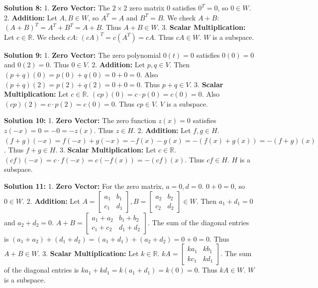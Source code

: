 \documentclass[11pt]{article}
\begin{document}
\vspace{0.3cm}
\textbf{Solution 8:}
1. \textbf{Zero Vector:} The $2 \times 2$ zero matrix $0$ satisfies $0^T = 0$, so $0 \in W$.
2. \textbf{Addition:} Let $A, B \in W$, so $A^T = A$ and $B^T = B$. We check $A+B$: $(A+B)^T = A^T + B^T = A + B$. Thus $A+B \in W$.
3. \textbf{Scalar Multiplication:} Let $c \in \mathbb{R}$. We check $cA$: $(cA)^T = c(A^T) = cA$. Thus $cA \in W$. $W$ is a subspace.

\vspace{0.3cm}
\textbf{Solution 9:}
1. \textbf{Zero Vector:} The zero polynomial $0(t) = 0$ satisfies $0(0) = 0$ and $0(2) = 0$. Thus $0 \in V$.
2. \textbf{Addition:} Let $p, q \in V$. Then $(p+q)(0) = p(0) + q(0) = 0 + 0 = 0$. Also $(p+q)(2) = p(2) + q(2) = 0 + 0 = 0$. Thus $p+q \in V$.
3. \textbf{Scalar Multiplication:} Let $c \in \mathbb{R}$. $(cp)(0) = c \cdot p(0) = c(0) = 0$. Also $(cp)(2) = c \cdot p(2) = c(0) = 0$. Thus $cp \in V$. $V$ is a subspace.

\vspace{0.3cm}
\textbf{Solution 10:}
1. \textbf{Zero Vector:} The zero function $z(x) = 0$ satisfies $z(-x) = 0 = -0 = -z(x)$. Thus $z \in H$.
2. \textbf{Addition:} Let $f, g \in H$. $(f+g)(-x) = f(-x) + g(-x) = -f(x) - g(x) = -(f(x) + g(x)) = -(f+g)(x)$. Thus $f+g \in H$.
3. \textbf{Scalar Multiplication:} Let $c \in \mathbb{R}$. $(cf)(-x) = c \cdot f(-x) = c(-f(x)) = -(cf)(x)$. Thus $cf \in H$. $H$ is a subspace.

\vspace{0.3cm}
\textbf{Solution 11:}
1. \textbf{Zero Vector:} For the zero matrix, $a=0, d=0$. $0+0=0$, so $0 \in W$.
2. \textbf{Addition:} Let $A = \begin{bmatrix} a_1 & b_1 \\ c_1 & d_1 \end{bmatrix}, B = \begin{bmatrix} a_2 & b_2 \\ c_2 & d_2 \end{bmatrix} \in W$. Then $a_1+d_1=0$ and $a_2+d_2=0$. $A+B = \begin{bmatrix} a_1+a_2 & b_1+b_2 \\ c_1+c_2 & d_1+d_2 \end{bmatrix}$. The sum of the diagonal entries is $(a_1+a_2) + (d_1+d_2) = (a_1+d_1) + (a_2+d_2) = 0 + 0 = 0$. Thus $A+B \in W$.
3. \textbf{Scalar Multiplication:} Let $k \in \mathbb{R}$. $kA = \begin{bmatrix} ka_1 & kb_1 \\ kc_1 & kd_1 \end{bmatrix}$. The sum of the diagonal entries is $ka_1 + kd_1 = k(a_1+d_1) = k(0) = 0$. Thus $kA \in W$. $W$ is a subspace.
\end{document}
